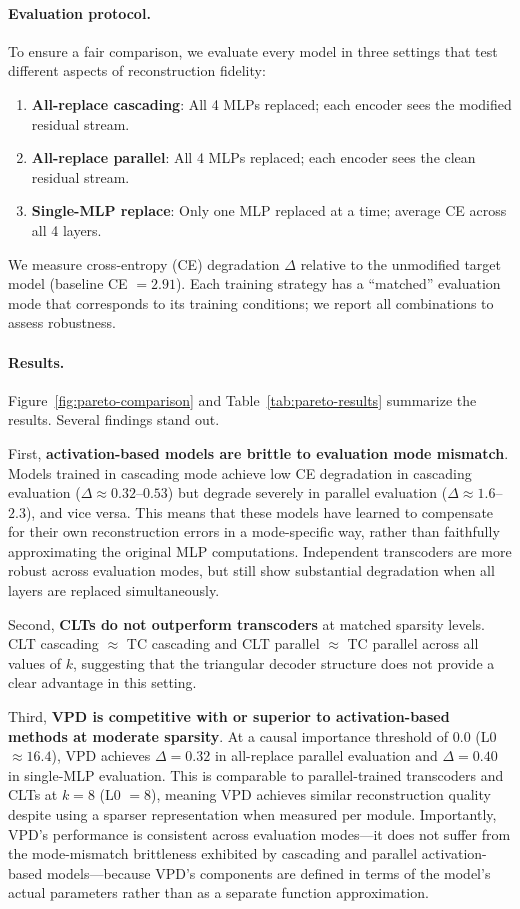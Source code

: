 \paragraph{Evaluation protocol.}
To ensure a fair comparison, we evaluate every model in three settings that test different aspects of reconstruction fidelity:
\begin{enumerate}
    \item \textbf{All-replace cascading}: All 4 MLPs replaced; each encoder sees the modified residual stream.
    \item \textbf{All-replace parallel}: All 4 MLPs replaced; each encoder sees the clean residual stream.
    \item \textbf{Single-MLP replace}: Only one MLP replaced at a time; average CE across all 4 layers.
\end{enumerate}
We measure cross-entropy (CE) degradation $\Delta$ relative to the unmodified target model (baseline CE $= 2.91$). Each training strategy has a ``matched'' evaluation mode that corresponds to its training conditions; we report all combinations to assess robustness.

\paragraph{Results.}
Figure~\ref{fig:pareto-comparison} and Table~\ref{tab:pareto-results} summarize the results. Several findings stand out.

First, \textbf{activation-based models are brittle to evaluation mode mismatch}. Models trained in cascading mode achieve low CE degradation in cascading evaluation ($\Delta \approx 0.32$--$0.53$) but degrade severely in parallel evaluation ($\Delta \approx 1.6$--$2.3$), and vice versa. This means that these models have learned to compensate for their own reconstruction errors in a mode-specific way, rather than faithfully approximating the original MLP computations. Independent transcoders are more robust across evaluation modes, but still show substantial degradation when all layers are replaced simultaneously.

Second, \textbf{CLTs do not outperform transcoders} at matched sparsity levels. CLT cascading $\approx$ TC cascading and CLT parallel $\approx$ TC parallel across all values of $k$, suggesting that the triangular decoder structure does not provide a clear advantage in this setting.

Third, \textbf{VPD is competitive with or superior to activation-based methods at moderate sparsity}. At a causal importance threshold of $0.0$ (L0 $\approx 16.4$), VPD achieves $\Delta = 0.32$ in all-replace parallel evaluation and $\Delta = 0.40$ in single-MLP evaluation. This is comparable to parallel-trained transcoders and CLTs at $k = 8$ (L0 $= 8$), meaning VPD achieves similar reconstruction quality despite using a sparser representation when measured per module. Importantly, VPD's performance is consistent across evaluation modes---it does not suffer from the mode-mismatch brittleness exhibited by cascading and parallel activation-based models---because VPD's components are defined in terms of the model's actual parameters rather than as a separate function approximation.

